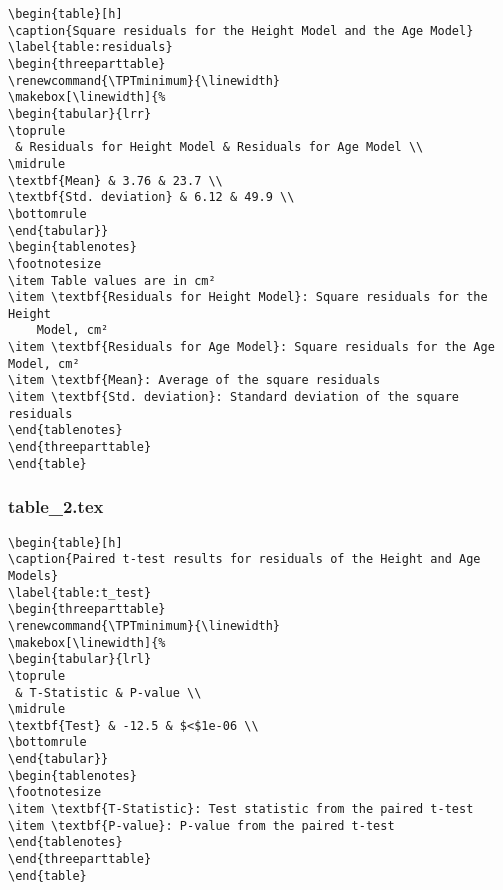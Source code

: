\documentclass[11pt]{article}
\begin{document}
\begin{Verbatim}[tabsize=4]
\begin{table}[h]
\caption{Square residuals for the Height Model and the Age Model}
\label{table:residuals}
\begin{threeparttable}
\renewcommand{\TPTminimum}{\linewidth}
\makebox[\linewidth]{%
\begin{tabular}{lrr}
\toprule
 & Residuals for Height Model & Residuals for Age Model \\
\midrule
\textbf{Mean} & 3.76 & 23.7 \\
\textbf{Std. deviation} & 6.12 & 49.9 \\
\bottomrule
\end{tabular}}
\begin{tablenotes}
\footnotesize
\item Table values are in cm²
\item \textbf{Residuals for Height Model}: Square residuals for the Height
	Model, cm²
\item \textbf{Residuals for Age Model}: Square residuals for the Age Model, cm²
\item \textbf{Mean}: Average of the square residuals
\item \textbf{Std. deviation}: Standard deviation of the square residuals
\end{tablenotes}
\end{threeparttable}
\end{table}

\end{Verbatim}

\subsubsection*{table\_2.tex}

\begin{Verbatim}[tabsize=4]
\begin{table}[h]
\caption{Paired t-test results for residuals of the Height and Age Models}
\label{table:t_test}
\begin{threeparttable}
\renewcommand{\TPTminimum}{\linewidth}
\makebox[\linewidth]{%
\begin{tabular}{lrl}
\toprule
 & T-Statistic & P-value \\
\midrule
\textbf{Test} & -12.5 & $<$1e-06 \\
\bottomrule
\end{tabular}}
\begin{tablenotes}
\footnotesize
\item \textbf{T-Statistic}: Test statistic from the paired t-test
\item \textbf{P-value}: P-value from the paired t-test
\end{tablenotes}
\end{threeparttable}
\end{table}

\end{Verbatim}
\end{document}
